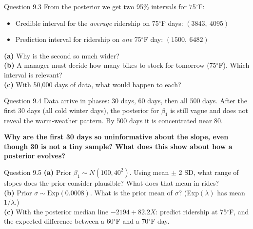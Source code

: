\documentclass[aspectratio=43,11pt]{beamer}
\begin{document}
\begin{frame}{Question 9.3}
  From the posterior we get two 95\% intervals for 75$^\circ$F:
  \begin{itemize}
    \item Credible interval for the \emph{average} ridership on 75$^\circ$F
      days: $(3843,\ 4095)$
    \item Prediction interval for ridership on \emph{one} 75$^\circ$F day:
      $(1500,\ 6482)$
  \end{itemize}
  \vspace{0.4em}
  \textbf{(a)} Why is the second so much wider? \\[0.3em]
  \textbf{(b)} A manager must decide how many bikes to stock for
  tomorrow (75$^\circ$F). Which interval is relevant? \\[0.3em]
  \textbf{(c)} With 50{,}000 days of data, what would happen to each?
\end{frame}

\begin{frame}{Question 9.4}
  Data arrive in phases: 30 days, 60 days, then all 500 days.
  After the first 30 days (all cold winter days), the posterior for
  $\beta_1$ is still vague and does not reveal the warm-weather pattern.
  By 500 days it is concentrated near 80.
  \vspace{0.6em}

  \textbf{Why are the first 30 days so uninformative about the slope,
  even though 30 is not a tiny sample? What does this show about how a
  posterior evolves?}
\end{frame}

\begin{frame}{Question 9.5}
  \textbf{(a)} Prior $\beta_1 \sim N(100, 40^2)$. Using mean $\pm$ 2 SD,
  what range of slopes does the prior consider plausible? What does that
  mean in rides? \\[0.3em]
  \textbf{(b)} Prior $\sigma \sim \text{Exp}(0.0008)$. What is the prior
  mean of $\sigma$? (Exp$(\lambda)$ has mean $1/\lambda$.) \\[0.3em]
  \textbf{(c)} With the posterior median line $-2194 + 82.2X$: predict
  ridership at 75$^\circ$F, and the expected difference between a
  60$^\circ$F and a 70$^\circ$F day.
\end{frame}
\end{document}
